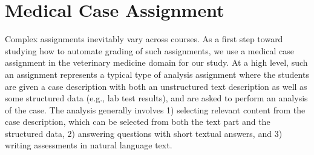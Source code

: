 \section{Medical Case Assignment}

Complex assignments inevitably vary across courses. As a first step toward
studying how to automate grading of such assignments, we  use a medical
case assignment in the veterinary medicine domain for our study. At a high
level, such an assignment represents a typical type of analysis assignment
where the students are given a case description with both an unstructured
text description as well as some structured data (e.g., lab test results),
and are asked to perform an analysis of the case. The analysis generally
involves 1) selecting relevant content from the case description, which can
be selected from both the text part and the structured data, 2) answering
questions with short textual answers, and 3) writing assessments in
natural language text.

